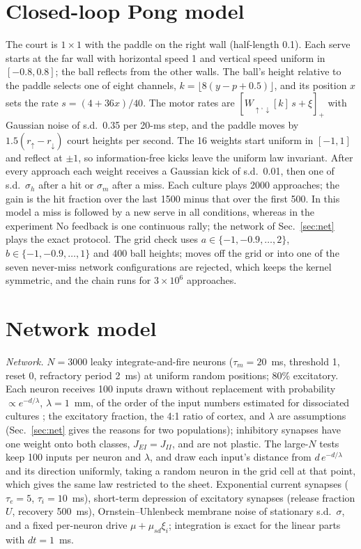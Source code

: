 \documentclass[pre,twocolumn,superscriptaddress,showpacs=false,amsmath,amssymb,nofootinbib]{revtex4-2}
\begin{document}
\appendix

\section{Closed-loop Pong model}\label{app:abstract}

The court is $1\times1$ with the paddle on the right wall (half-length 0.1). Each serve starts at the far wall with horizontal speed 1 and vertical speed uniform in $[-0.8,0.8]$; the ball reflects from the other walls. The ball's height relative to the paddle selects one of eight channels, $k=\lfloor8(y-p+0.5)\rfloor$, and its position $x$ sets the rate $s=(4+36x)/40$. The motor rates are $[W_{\uparrow,\downarrow}[k]\,s+\xi]_+$ with Gaussian noise of s.d.\ 0.35 per 20-ms step, and the paddle moves by $1.5(r_\uparrow-r_\downarrow)$ court heights per second. The 16 weights start uniform in $[-1,1]$ and reflect at $\pm1$, so information-free kicks leave the uniform law invariant. After every approach each weight receives a Gaussian kick of s.d.\ 0.01, then one of s.d.\ $\sigma_h$ after a hit or $\sigma_m$ after a miss. Each culture plays 2000 approaches; the gain is the hit fraction over the last 1500 minus that over the first 500. In this model a miss is followed by a new serve in all conditions, whereas in the experiment No feedback is one continuous rally; the network of Sec.~\ref{sec:net} plays the exact protocol. The grid check uses $a\in\{-1,-0.9,\dots,2\}$, $b\in\{-1,-0.9,\dots,1\}$ and 400 ball heights; moves off the grid or into one of the seven never-miss network configurations are rejected, which keeps the kernel symmetric, and the chain runs for $3\times10^6$ approaches.

\section{Network model}\label{app:net}

\emph{Network.} $N=3000$ leaky integrate-and-fire neurons ($\tau_m=20$~ms, threshold 1, reset 0, refractory period 2~ms) at uniform random positions; 80\% excitatory. Each neuron receives 100 inputs drawn without replacement with probability $\propto e^{-d/\lambda}$, $\lambda=1$~mm, of the order of the input numbers estimated for dissociated cultures \cite{Soriano2008}; the excitatory fraction, the 4:1 ratio of cortex, and $\lambda$ are assumptions (Sec.~\ref{sec:net} gives the reasons for two populations); inhibitory synapses have one weight onto both classes, $J_{EI}=J_{II}$, and are not plastic. The large-$N$ tests keep 100 inputs per neuron and $\lambda$, and draw each input's distance from $d\,e^{-d/\lambda}$ and its direction uniformly, taking a random neuron in the grid cell at that point, which gives the same law restricted to the sheet. Exponential current synapses ($\tau_e=5$, $\tau_i=10$~ms), short-term depression of excitatory synapses (release fraction $U$, recovery 500~ms), Ornstein--Uhlenbeck membrane noise of stationary s.d.\ $\sigma$, and a fixed per-neuron drive $\mu+\mu_{sd}\xi_i$; integration is exact for the linear parts with $dt=1$~ms.
\end{document}
